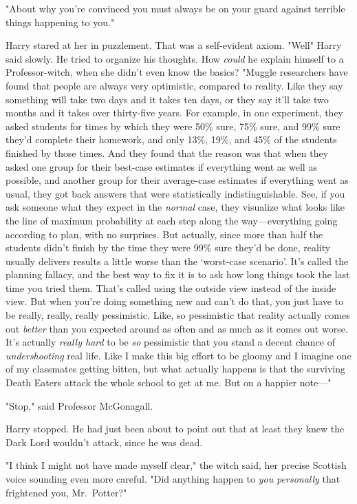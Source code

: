 "About why you're convinced you must always be on your guard against terrible
things happening to you."

Harry stared at her in puzzlement. That was a self-evident axiom.
"Well{\el}" Harry said slowly. He tried to organize his thoughts. How
\emph{could} he explain himself to a Professor-witch, when she didn't even know
the basics? "Muggle researchers have found that people are always very
optimistic, compared to reality. Like they say something will take two days and
it takes ten days, or they say it'll take two months and it takes over
thirty-five years. For example, in one experiment, they asked students for
times by which they were 50\% sure, 75\% sure, and 99\% sure they'd complete their
homework, and only 13\%, 19\%, and 45\% of the students finished by those times.
And they found that the reason was that when they asked one group for their
best-case estimates if everything went as well as possible, and another group
for their average-case estimates if everything went as usual, they got back
answers that were statistically indistinguishable. See, if you ask someone what
they expect in the \emph{normal} case, they visualize what looks like the line
of maximum probability at each step along the way—everything going according
to plan, with no surprises. But actually, since more than half the students
didn't finish by the time they were 99\% sure they'd be done, reality usually
delivers results a little worse than the `worst-case scenario'. It's called the
planning fallacy, and the best way to fix it is to ask how long things took the
last time you tried them. That's called using the outside view instead of the
inside view. But when you're doing something new and can't do that, you just
have to be really, really, really pessimistic. Like, so pessimistic that
reality actually comes out \emph{better} than you expected around as often and
as much as it comes out worse. It's actually \emph{really hard} to be \emph{so}
pessimistic that you stand a decent chance of \emph{undershooting} real life.
Like I make this big effort to be gloomy and I imagine one of my classmates
getting bitten, but what actually happens is that the surviving Death Eaters
attack the whole school to get at me. But on a happier note—"

"Stop," said Professor McGonagall.

Harry stopped. He had just been about to point out that at least they knew the
Dark Lord wouldn't attack, since he was dead.

"I think I might not have made myself clear," the witch said, her precise
Scottish voice sounding even more careful. "Did anything happen to \emph{you
personally} that frightened you, Mr.~Potter?"

